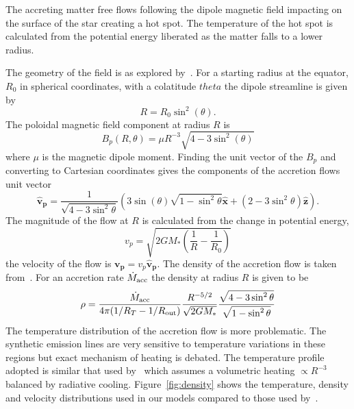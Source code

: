 \documentclass[fleqn,usenatbib]{mnras}
\begin{document}
The accreting matter free flows following the dipole magnetic field impacting on the surface of the star creating a hot spot. The temperature of the hot spot is calculated from the potential energy liberated as the matter falls to a lower radius.

The geometry of the field is as explored by~\citet{1991ApJ...370L..39K,1977ApJ...217..578G}. For a starting radius at the equator, $R_{0}$ in spherical coordinates, with a colatitude $theta$ the dipole streamline is given by
\begin{equation}
    R = R_{0}\sin^{2}(\theta).
\end{equation}
The poloidal magnetic field component at radius $R$ is
\begin{equation}
    B_{p}(R,\theta) = \mu R^{-3}\sqrt{4-3\sin^{2}(\theta )}
\end{equation}
where $\mu$ is the magnetic dipole moment. Finding the unit vector of the $B_p$ and converting to Cartesian coordinates gives the components of the accretion flows unit vector
\begin{equation}
     \mathbf{\hat{v}_p} = \frac{1}{\sqrt{4-3\sin^2\theta}}\left(3\sin(\theta)\sqrt{1-\sin^2\theta}\mathbf{\hat{x}}+(2-3\sin^2\theta)\mathbf{\hat{z}}\right).
\end{equation}
The magnitude of the flow at $R$ is calculated from the change in potential energy,
\begin{equation}
    v_p = \sqrt{2GM_{\ast}(\frac{1}{R} - \frac{1}{R_0})}
\end{equation}
the velocity of the flow is $\mathbf{v_p}=v_p\mathbf{\hat{v}_p}$.
The density of the accretion flow is taken from~\citep{Hartmann:1994tl}. For an accretion rate $\dot{M}_{\rm acc}$ the density at radius $R$ is given to be
\begin{equation}
    \rho = \frac{\dot{M}_{\rm acc}}{4\pi(1/R_T - 1/R_{\rm out})}\frac{R^{-5/2}}{\sqrt{2GM_{\ast}}}\frac{\sqrt{4-3\sin^2\theta}}{\sqrt{1-\sin^2\theta}}
\end{equation}
The temperature distribution of the accretion flow is more problematic. The synthetic emission lines are very sensitive to temperature variations in these regions but exact mechanism of heating is debated. The temperature profile adopted is similar that used by~\citet{Hartmann:1994tl,1998ApJ...492..743M} which assumes a volumetric heating $\propto R^{-3}$ balanced by radiative cooling. Figure~\ref{fig:density} shows the temperature, density and velocity distributions used in our models compared to those used by~\citet{1998ApJ...492..743M}.
\end{document}
